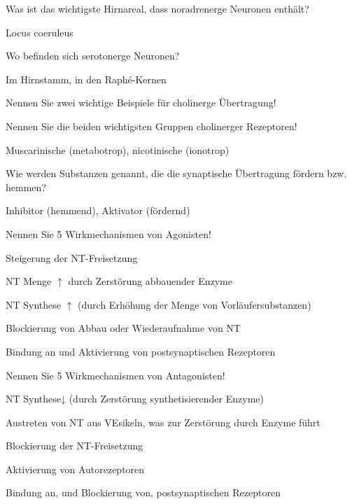 \documentclass[10pt, a4paper]{exam}
\newcommand\Warning{%
 \makebox[1.4em][c]{%
 \makebox[0pt][c]{\raisebox{.1em}{\small!}}%
 \makebox[0pt][c]{\color{red}\Large$\bigtriangleup$}}}%
\begin{document}
\begin{questions}
  \question Was ist das wichtigste Hirnareal, dass noradrenerge Neuronen enthält?
  \begin{solution}
    Locus coeruleus
  \end{solution}

  \question Wo befinden sich serotonerge Neuronen?
  \begin{solution}
    Im Hirnstamm, in den Raphé-Kernen
  \end{solution}

  \question Nennen Sie zwei wichtige Beispiele für cholinerge Übertragung!
  \begin{solution}

  \end{solution}

  \question Nennen Sie die beiden wichtigsten Gruppen cholinerger Rezeptoren!
  \begin{solution}
    Muscarinische (metabotrop), nicotinische (ionotrop) \Warning
  \end{solution}

  \question Wie werden Substanzen genannt, die die synaptische Übertragung fördern bzw. hemmen?
  \begin{solution}
    Inhibitor (hemmend), Aktivator (fördernd)
  \end{solution}

  \question Nennen Sie 5 Wirkmechanismen von Agonisten!
  \begin{solution}
    \begin{itemize*}
      \item Steigerung der NT-Freisetzung
      \item NT Menge $\uparrow$ durch Zerstörung abbauender Enzyme
      \item NT Synthese $\uparrow$ (durch Erhöhung der Menge von Vorläufersubstanzen)
      \item Blockierung von Abbau oder Wiederaufnahme von NT
      \item Bindung an und Aktivierung von postsynaptischen Rezeptoren
    \end{itemize*}
  \end{solution}

  \question Nennen Sie 5 Wirkmechanismen von Antagonisten!
  \begin{solution}
    \begin{itemize*}
      \item NT Synthese↓ (durch Zerstörung synthetisierender Enzyme)
      \item Austreten von NT aus VEsikeln, was zur Zerstörung durch Enzyme führt
      \item Blockierung der NT-Freisetzung
      \item Aktivierung von Autorezeptoren
      \item Bindung an, und Blockierung von, postsynaptischen Rezeptoren
    \end{itemize*}
  \end{solution}


\end{questions}
\end{document}
